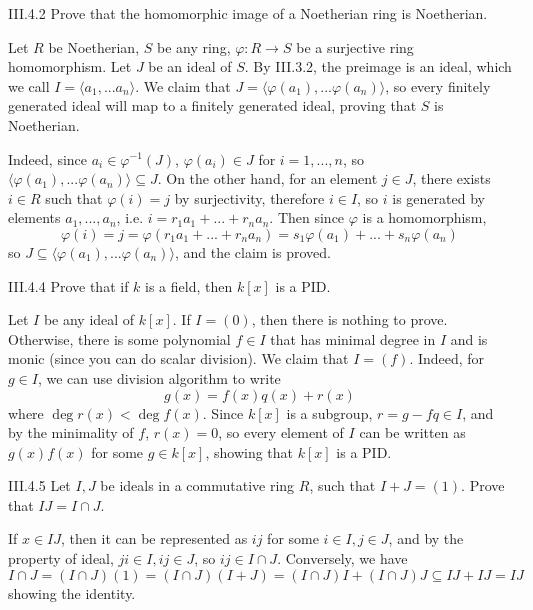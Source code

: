 \begin{problem}{III.4.2}
Prove that the homomorphic image of a Noetherian ring is Noetherian.
\end{problem}
\begin{pf}
Let $R$ be Noetherian, $S$ be any ring, $\varphi:R \to S$ be a surjective ring homomorphism. Let $J$ be an ideal of $S$. By III.3.2, the preimage is an ideal, which we call $I = \langle a_1, ... a_n \rangle$. We claim that $J = \langle \varphi(a_1), ... \varphi(a_n) \rangle$, so every finitely generated ideal will map to a finitely generated ideal, proving that $S$ is Noetherian. 

Indeed, since $a_i \in \varphi^{-1}(J)$, $\varphi(a_i) \in J$ for $i = 1,...,n$, so $\langle \varphi(a_1), ... \varphi(a_n) \rangle \subseteq J$. On the other hand, for an element $j \in J$, there exists $i \in R$ such that $\varphi(i) = j$ by surjectivity, therefore $i \in I$, so $i$ is generated by elements $a_1, ... ,a_n$, i.e. $i = r_1a_1 + ... + r_na_n$. Then since $\varphi$ is a homomorphism, 
\[
\varphi(i) = j = \varphi(r_1a_1 + ... + r_na_n) = s_1\varphi(a_1) + ... + s_n\varphi(a_n)
\]
so $J \subseteq \langle \varphi(a_1), ... \varphi(a_n) \rangle$, and the claim is proved.
\end{pf}

\begin{problem}{III.4.4}
Prove that if $k$ is a field, then $k[x]$ is a PID.
\end{problem}
\begin{pf}
Let $I$ be any ideal of $k[x]$. If $I = (0)$, then there is nothing to prove. Otherwise, there is some polynomial $f\in I$ that has minimal degree in $I$ and is monic (since you can do scalar division). We claim that $I = (f)$. Indeed, for $g \in I$, we can use division algorithm to write
\[
g(x) = f(x)q(x) + r(x)  
\]  
where $\deg r(x) < \deg f(x)$. Since $k[x]$ is a subgroup, $r = g - fq \in I$, and by the minimality of $f$, $r(x) = 0$, so every element of $I$ can be written as $g(x)f(x)$ for some $g \in k[x]$, showing that $k[x]$ is a PID.
\end{pf}

\begin{problem}{III.4.5}
Let $I, J$ be ideals in a commutative ring $R$, such that $I+J = (1)$. Prove that $IJ = I \cap J$.
\end{problem}
\begin{pf}
If $x \in IJ$, then it can be represented as $ij$ for some $i \in I, j \in J$, and by the property of ideal, $ji \in I, ij \in J$, so $ij \in I \cap J$. Conversely, we have
\[
I \cap J = (I \cap J) (1) = (I\cap J)(I+J) = (I \cap J)I + (I \cap J)J \subseteq IJ + IJ = IJ 
\]
showing the identity.
\end{pf}

